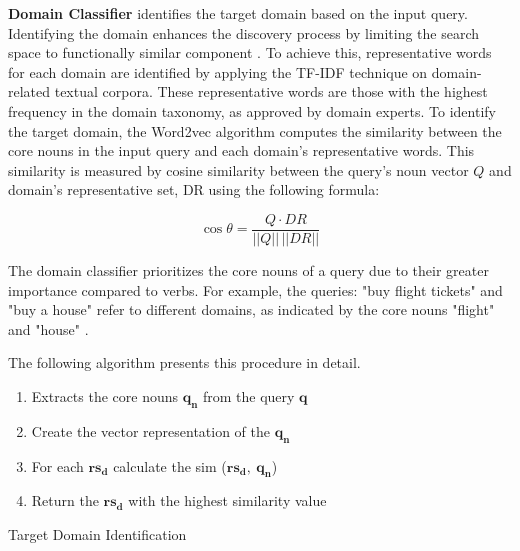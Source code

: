 \textbf{Domain Classifier} identifies the target domain based on the
input query. Identifying the domain enhances the discovery process by
limiting the search space to functionally similar component \autocite{Zhang2018}. To achieve this, representative words for each domain are
identified by applying the TF-IDF technique on domain-related textual
corpora. These representative words are those with the highest frequency
in the domain taxonomy, as approved by domain experts. To identify the
target domain, the Word2vec algorithm computes the similarity between
the core nouns in the input query and each domain's representative
words. This similarity is measured by cosine similarity between the
query's noun vector \(Q\) and domain's representative set, DR using the
following formula:

\begin{equation}
\cos\theta = \frac{Q \cdot DR}{||Q|| \, ||DR||}
\end{equation}

The domain classifier prioritizes the core nouns of a query due to their greater importance compared to verbs. For example, the queries: "buy flight tickets" and "buy a house" refer to different domains, as indicated by the core nouns "flight" and "house" \autocite{Zhang2018}. 

The following algorithm presents this procedure in detail.

\setlength{\algomargin}{2em} %
\begin{algorithm}
	\DontPrintSemicolon
	
	\begin{enumerate}
	\item 
	Extracts the core nouns \(\mathbf{q}_{\mathbf{n}}\) from the query
	  \(\mathbf{q}\)
	\item 
	Create the vector representation of the \(\mathbf{q}_{\mathbf{n}}\)
	\item 
	For each \(\mathbf{rs}_{\mathbf{d}}\) calculate the sim
	  (\(\mathbf{rs}_{\mathbf{d}}\mathbf{,\ }\mathbf{q}_{\mathbf{n}}\))
	\item 
	Return the \(\mathbf{rs}_{\mathbf{d}}\) with the highest similarity
	  value
	\end{enumerate}
	
\caption{Target Domain Identification}\label{alg:disc-domain}
\end{algorithm}


